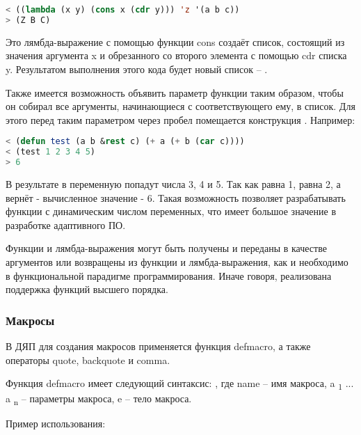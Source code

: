 \begin{lstlisting}[language=Lisp, frame=none]
< ((lambda (x y) (cons x (cdr y))) 'z '(a b c))
> (Z B C)
\end{lstlisting}

Это лямбда-выражение с помощью функции cons создаёт список, состоящий из значения аргумента x и обрезанного со второго элемента с помощью cdr списка y. Результатом выполнения этого кода будет новый список -- .

Также имеется возможность объявить параметр функции таким образом, чтобы он собирал все аргументы, начинающиеся с соответствующего ему, в список. Для этого перед таким параметром через пробел помещается конструкция . Например:

\begin{lstlisting}[language=Lisp, frame=none]
< (defun test (a b &rest c) (+ a (+ b (car c))))
< (test 1 2 3 4 5)
> 6
\end{lstlisting}

В результате в переменную  попадут числа 3, 4 и 5. Так как  равна 1,  равна 2, а  вернёт  - вычисленное значение - 6. Такая возможность позволяет разрабатывать функции с динамическим числом переменных, что имеет большое значение в разработке адаптивного ПО.

Функции и лямбда-выражения могут быть получены и переданы в качестве аргументов или возвращены из функции и лямбда-выражения, как и необходимо в функциональной парадигме программирования. Иначе говоря, реализована поддержка функций высшего порядка.

\subsubsection{Макросы}

В ДЯП для создания макросов применяется функция defmacro, а также операторы quote, backquote и comma.

Функция defmacro имеет следующий синтаксис:
, где name -- имя макроса, a \textsubscript 1 ... a \textsubscript n -- параметры макроса, e -- тело макроса.

Пример использования:

